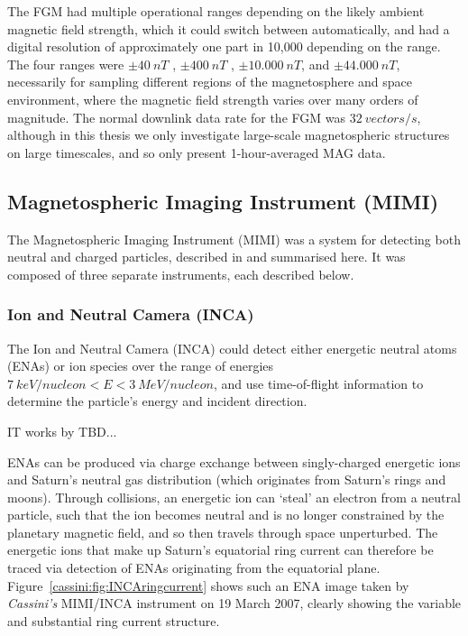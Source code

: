 The FGM had multiple operational ranges depending on the likely ambient magnetic field strength, which it could switch between automatically, and had a digital resolution of approximately one part in 10,000 depending on the range. The four ranges were $\pm\SI{40}{nT}$ , $\pm\SI{400}{nT}$ , $\pm\SI{10,000}{nT}$, and $\pm\SI{44,000}{nT}$, necessarily for sampling different regions of the magnetosphere and space environment, where the magnetic  field strength  varies over many orders of magnitude. The normal downlink data rate for the FGM was $\SI{32}{vectors/s}$, although in this thesis we only investigate large-scale magnetospheric structures on large timescales, and so only present 1-hour-averaged MAG data.

\subsection{Magnetospheric Imaging Instrument (MIMI)}
The Magnetospheric Imaging Instrument (MIMI) was a system for detecting both neutral and charged particles, described in \citet{krimigis2004} and summarised here. It was composed of three separate instruments, each described below.
\subsubsection{Ion and Neutral Camera (INCA)}
The Ion and Neutral Camera (INCA) could detect either energetic neutral atoms (ENAs) or ion species over the range of energies $\SI{7}{keV/nucleon}<E<\SI{3}{MeV/nucleon}$, and use time-of-flight information to determine the particle's energy and incident direction.

IT works by TBD...

ENAs can be produced via charge exchange between singly-charged energetic ions and Saturn's neutral gas distribution (which originates from Saturn's rings and moons). Through collisions, an energetic ion can `steal' an electron from a neutral particle, such that the ion becomes neutral and is no longer constrained by the planetary magnetic field, and so then travels through space unperturbed. The energetic ions that make up Saturn's equatorial ring current can therefore be traced via detection of ENAs originating from the equatorial plane. Figure~\ref{cassini:fig:INCAringcurrent} shows such an ENA image taken by \textit{Cassini's} MIMI/INCA instrument  on 19 March 2007, clearly showing the variable and substantial ring current structure. 

